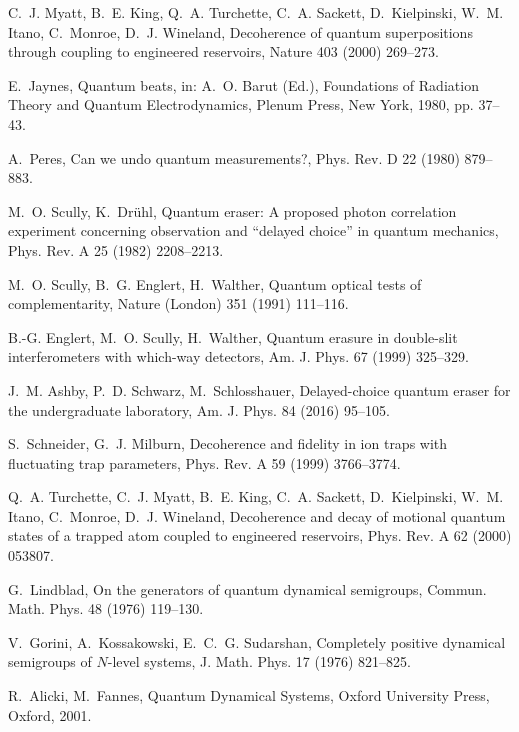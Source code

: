 \documentclass[3p,sort&compress,12pt]{elsarticle}
\begin{document}
\begin{thebibliography}{100}
C.~J. Myatt, B.~E. King, Q.~A. Turchette, C.~A. Sackett, D.~Kielpinski, W.~M.
  Itano, C.~Monroe, D.~J. Wineland, Decoherence of quantum superpositions
  through coupling to engineered reservoirs, Nature 403 (2000) 269--273.

E.~Jaynes, Quantum beats, in: A.~O. Barut (Ed.), Foundations of Radiation
  Theory and Quantum Electrodynamics, Plenum Press, New York, 1980, pp. 37--43.

A.~Peres, Can we undo quantum measurements?, Phys. Rev. D 22 (1980) 879--883.

M.~O. Scully, K.~Dr{\"u}hl, Quantum eraser: {A} proposed photon correlation
  experiment concerning observation and {``}delayed choice{''} in quantum
  mechanics, Phys. Rev. A 25 (1982) 2208--2213.

M.~O. Scully, B.~G. Englert, H.~Walther, Quantum optical tests of
  complementarity, Nature (London) 351 (1991) 111--116.

B.-G. Englert, M.~O. Scully, H.~Walther, Quantum erasure in double-slit
  interferometers with which-way detectors, Am. J. Phys. 67 (1999) 325--329.

J.~M. Ashby, P.~D. Schwarz, M.~Schlosshauer, Delayed-choice quantum eraser for
  the undergraduate laboratory, Am. J. Phys. 84 (2016) 95--105.

S.~Schneider, G.~J. Milburn, Decoherence and fidelity in ion traps with
  fluctuating trap parameters, Phys. Rev. A 59 (1999) 3766--3774.

Q.~A. Turchette, C.~J. Myatt, B.~E. King, C.~A. Sackett, D.~Kielpinski, W.~M.
  Itano, C.~Monroe, D.~J. Wineland, Decoherence and decay of motional quantum
  states of a trapped atom coupled to engineered reservoirs, Phys. Rev. A 62
  (2000) 053807.

G.~Lindblad, On the generators of quantum dynamical semigroups, Commun. Math.
  Phys. 48 (1976) 119--130.

V.~Gorini, A.~Kossakowski, E.~C.~G. Sudarshan, Completely positive dynamical
  semigroups of {$N$}-level systems, J. Math. Phys. 17 (1976) 821--825.

R.~Alicki, M.~Fannes, Quantum Dynamical Systems, Oxford University Press,
  Oxford, 2001.


\end{thebibliography}
\end{document}
